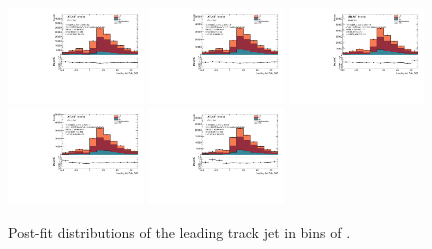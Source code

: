 \begin{figure}[htbp]
  \centering
 \includegraphics[width=0.32\textwidth]{figures/gbb/Sub_Sd0_Fits/Canv_Fit_-3-logM_bb_over_p_TG--22_LpT_INF_SpT_INF_coarse_x.pdf}
 \includegraphics[width=0.32\textwidth]{figures/gbb/Sub_Sd0_Fits/Canv_Fit_-22-logM_bb_over_p_TG--19_LpT_INF_SpT_INF_coarse_x.pdf}
 \includegraphics[width=0.32\textwidth]{figures/gbb/Sub_Sd0_Fits/Canv_Fit_-19-logM_bb_over_p_TG--15_LpT_INF_SpT_INF_coarse_x.pdf}\\
 \includegraphics[width=0.32\textwidth]{figures/gbb/Sub_Sd0_Fits/Canv_Fit_-15-logM_bb_over_p_TG--11_LpT_INF_SpT_INF_coarse_x.pdf}
 \includegraphics[width=0.32\textwidth]{figures/gbb/Sub_Sd0_Fits/Canv_Fit_-11-logM_bb_over_p_TG-0_LpT_INF_SpT_INF_coarse_x.pdf}


\caption{Post-fit \subsdzero distributions of the leading track jet in bins of \mpt. }
  \label{fig:fracmasspt-postfits-leading}
\end{figure}


